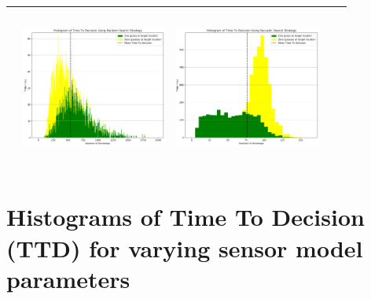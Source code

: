 \begin{landscape}
\begin{table}[h!]
\begin{tabular}{ | c | c | c | c | c |}
\begin{minipage}[c][58mm][c]{48mm}
    \end{minipage}
    &
    \begin{minipage}[c][58mm][c]{48mm}
      \includegraphics[width=48mm, height=52mm]{Chapters/MultiAgentTargetDetection/Figs/Histograms/VaryingInitBelief/25/25RandomHistogram.png}
    \end{minipage}
    &
    \begin{minipage}[c][58mm][c]{48mm}
      \includegraphics[width=48mm, height=52mm]{Chapters/MultiAgentTargetDetection/Figs/Histograms/VaryingInitBelief/25/25SaccadicHistogram.png}
    \end{minipage}
    \\
    \hline
   
  \end{tabular}
  \label{table:HistVaryingCumulativeInitial}
\end{table}
\break




\vspace*{\fill}
\section{Histograms of Time To Decision (TTD) for varying sensor model parameters}


\end{landscape}
